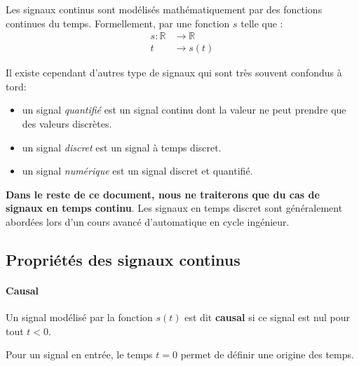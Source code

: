 Les signaux continus sont modélisés mathématiquement par des fonctions 
continues du temps. Formellement, par une fonction $s$ telle que :
\begin{align*}
s : \mathbb{R}&\rightarrow\mathbb{R} \\  
t&\rightarrow s(t) 
\end{align*}    

Il existe cependant d'autres type de signaux qui sont très souvent confondus 
à tord:
\begin{itemize}
    \item un signal \emph{quantifié} est un signal continu 
          dont la valeur ne peut prendre que des valeurs discrètes. 
    \item un signal \emph{discret} est un signal à temps discret.
    \item un signal \emph{numérique} est un signal discret et quantifié.   
\end{itemize}

\textbf{Dans le reste de ce document, nous ne traiterons que
du cas de signaux en temps continu}. Les signaux en temps discret
sont généralement abordées lors d'un cours 
avancé d'automatique en cycle ingénieur.

\subsection{Propriétés des signaux continus}

\paragraph{Causal}

Un signal modélisé par la fonction $s(t)$ est dit \textbf{causal}
si ce signal est nul pour tout $t<0$. 
\begin{figure}[htb]
    \centering
    
\end{figure}
Pour un signal en entrée, le temps $t=0$ permet de 
définir une origine des temps.

